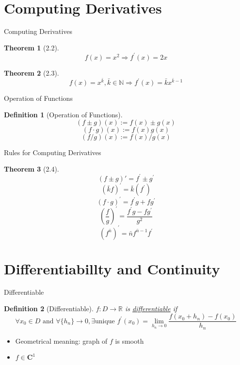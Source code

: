 \documentclass[a4paper,11pt]{article}
\newtheorem{defn}{Definition}
\newtheorem{thm}{Theorem}
\begin{document}
\section{Computing Derivatives} %
\label{sec:computing_derivatives}

\begin{frame}[t]{Computing Derivatives}
	\begin{thm}
		[2.2]
		\[
			f(x)=x^2 \Rightarrow f^\prime (x) = 2x
		\]
	\end{thm}

	\begin{thm}
		[2.3]
		\[
			f(x)=x^{\bar k} , \bar k \in \mathbb{N} \Rightarrow f^\prime (x) = \bar k x^{\bar k - 1}
		\]
	\end{thm}
\end{frame}

\begin{frame}[t]{Operation of Functions}
	\begin{defn}
		[Operation of Functions]
		\[
			(f\pm g)(x) := f(x)\pm g(x)
		\]
		\[
			(f\cdot g)(x) := f(x)g(x)
		\]\[
			(f/g)(x) := f(x)/g(x)
		\]
	\end{defn}
\end{frame}

\begin{frame}[t]{Rules for Computing Derivatives}
	\begin{thm}
		[2.4]
		\[
			(f\pm g)\prime = f^\prime \pm g^\prime
		\]\[
			(\bar k f)^\prime = \bar k (f^\prime)
		\]\[
			(f\cdot g)^\prime = f^\prime g + f g^\prime 
		\]\[
			\left(\frac{f}{g}\right)^\prime = \frac{f^\prime g - fg^\prime}{g^2}
		\]\[
			(f^{\bar n})^\prime = \bar n f^{\bar n - 1} f^\prime 
		\]
	\end{thm}
\end{frame}


\section{Differentiabillty and Continuity} %
\label{sec:differentiablilty_and_continuity}
\begin{frame}[t]{Differentiable}
	\begin{defn}
		[Differentiable]
		$f:D\rightarrow \mathbb{R}$ is \uline{differentiable} if \[
			\forall x_0\in D\text{ and }\forall\{h_n\}\rightarrow 0, \exists \text{unique } f^\prime(x_0) = \lim_{h_n\rightarrow 0}\frac{f(x_0+h_n)-f(x_0)}{h_n}
		\]
	\end{defn}
	\begin{itemize}
		\item Geometrical meaning: graph of $f$ is smooth
		\item $f\in \mathbf{C}^1$
	\end{itemize}
\end{frame}
\end{document}
